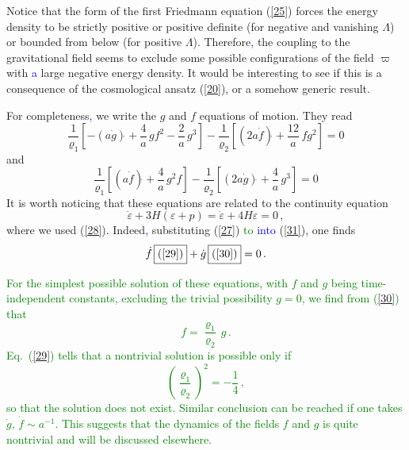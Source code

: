 \documentclass[prd,reprint,eqsecnum,nofootinbib]{revtex4-1}
\begin{document}
Notice that the form of the first Friedmann equation (\ref{25})
forces the energy density to be strictly positive or positive
definite (for negative and vanishing $\Lambda$) or bounded from
below (for positive $\Lambda$). Therefore\textcolor{blue}{,} the coupling to the
gravitational field seems to exclude some possible configurations of
the field $\varpi$ with \textcolor{blue}{a} large negative energy density. It would be
interesting to see if this is a consequence of the cosmological
ansatz (\ref{20}), or a somehow generic result.

For completeness\textcolor{blue}{,} we write the $g$ and $f$ equations of motion. They
read
\begin{equation}
\frac1{\varrho_1}\left[ -(a\dot g)\dot{} + \frac{4}a\, gf^2 -
\frac{2}a\, g^3\right] -\frac1{\varrho_2}\left[ (2a\dot f)\dot{} +
\frac{12}a\, fg^2 \right]=0\label{29}
\end{equation}
and
\begin{equation}
\frac1{\varrho_1}\left[ (a\dot f)\dot{} + \frac{4}a\, g^2f \right]
-\frac1{\varrho_2}\left[ (2a\dot g)\dot{} + \frac{4}a\, g^3
\right]=0\label{30}
\end{equation}
It is worth noticing that these equations are related to the
continuity equation
\begin{equation}\label{31}
\dot \varepsilon +3H(\varepsilon+p)= \dot \varepsilon
+4H\varepsilon=0\,,
\end{equation}
where we used (\ref{28}). Indeed\textcolor{blue}{,} substituting (\ref{27}) \textcolor{green}{to} \textcolor{blue}{into}
(\ref{31})\textcolor{blue}{,} one finds
\begin{equation}\label{32}
    \dot f\, \mbox{\framebox{(\ref{29})}} +\dot g\, \mbox{\framebox{(\ref{30})}}=0\,.
\end{equation}

\textcolor{green}{For the simplest possible solution of these equations, with $f$ and
$g$ being time-independent constants, excluding the trivial
possibility $g=0$, we find from (\ref{30}) that
$$f=\frac{\varrho_1}{\varrho_2}\,g\,.$$ Eq.\ (\ref{29}) tells
that a nontrivial solution is possible only
if$$\left(\frac{\varrho_1}{\varrho_2}\right)^2=-\frac1{4}\,,$$ so
that the solution does not exist. Similar conclusion can be reached
if one takes $\dot g,\, \dot f \sim a^{-1}$. This suggests that the
dynamics of the fields $f$ and $g$ is quite nontrivial and will be
discussed elsewhere.}
\end{document}
